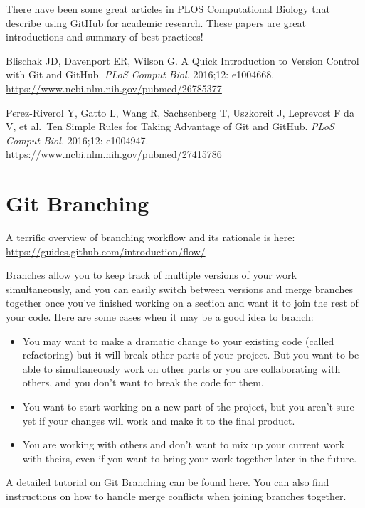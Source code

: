 \documentclass[
]{book}
\providecommand{\tightlist}{%
  \setlength{\itemsep}{0pt}\setlength{\parskip}{0pt}}
\begin{document}
There have been some great articles in PLOS Computational Biology that describe using GitHub for academic research. These papers are great introductions and summary of best practices!

Blischak JD, Davenport ER, Wilson G. A Quick Introduction to Version Control with Git and GitHub. \emph{PLoS Comput Biol.} 2016;12: e1004668. \url{https://www.ncbi.nlm.nih.gov/pubmed/26785377}

Perez-Riverol Y, Gatto L, Wang R, Sachsenberg T, Uszkoreit J, Leprevost F da V, et al.~Ten Simple Rules for Taking Advantage of Git and GitHub. \emph{PLoS Comput Biol.} 2016;12: e1004947. \url{https://www.ncbi.nlm.nih.gov/pubmed/27415786}

\section{Git Branching}\label{git-branching}

A terrific overview of branching workflow and its rationale is here: \url{https://guides.github.com/introduction/flow/}

Branches allow you to keep track of multiple versions of your work simultaneously, and you can easily switch between versions and merge branches together once you've finished working on a section and want it to join the rest of your code. Here are some cases when it may be a good idea to branch:

\begin{itemize}
\tightlist
\item
  You may want to make a dramatic change to your existing code (called refactoring) but it will break other parts of your project. But you want to be able to simultaneously work on other parts or you are collaborating with others, and you don't want to break the code for them.
\item
  You want to start working on a new part of the project, but you aren't sure yet if your changes will work and make it to the final product.
\item
  You are working with others and don't want to mix up your current work with theirs, even if you want to bring your work together later in the future.
\end{itemize}

A detailed tutorial on Git Branching can be found \href{https://sp19.datastructur.es/materials/guides/using-git#e-git-branching-advanced-git-optional}{here}. You can also find instructions on how to handle merge conflicts when joining branches together.
\end{document}
